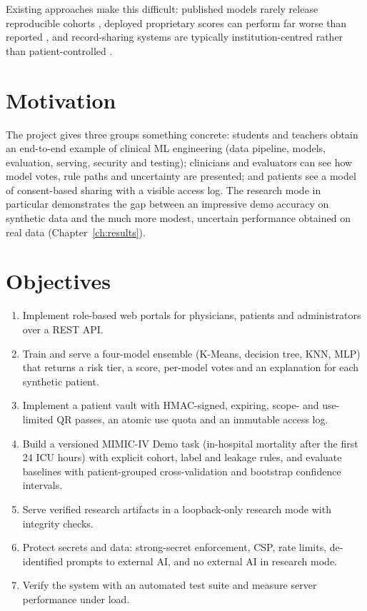 Existing approaches make this difficult: published models rarely release reproducible cohorts
\cite{johnson2017reproducibility}, deployed proprietary scores can perform far worse than reported
\cite{wong2021epicsepsis}, and record-sharing systems are typically institution-centred rather than
patient-controlled \cite{azaria2016medrec}.

\section{Motivation}
The project gives three groups something concrete: students and teachers obtain an end-to-end example
of clinical ML engineering (data pipeline, models, evaluation, serving, security and testing);
clinicians and evaluators can see how model votes, rule paths and uncertainty are presented; and
patients see a model of consent-based sharing with a visible access log. The research mode in
particular demonstrates the gap between an impressive demo accuracy on synthetic data and the much
more modest, uncertain performance obtained on real data (Chapter~\ref{ch:results}).

\section{Objectives}
\begin{enumerate}[label=O\arabic*.]
\item Implement role-based web portals for physicians, patients and administrators over a REST API.
\item Train and serve a four-model ensemble (K-Means, decision tree, KNN, MLP) that returns a risk tier,
      a score, per-model votes and an explanation for each synthetic patient.
\item Implement a patient vault with HMAC-signed, expiring, scope- and use-limited QR passes, an
      atomic use quota and an immutable access log.
\item Build a versioned MIMIC-IV Demo task (in-hospital mortality after the first 24 ICU hours) with
      explicit cohort, label and leakage rules, and evaluate baselines with patient-grouped
      cross-validation and bootstrap confidence intervals.
\item Serve verified research artifacts in a loopback-only research mode with integrity checks.
\item Protect secrets and data: strong-secret enforcement, CSP, rate limits, de-identified prompts
      to external AI, and no external AI in research mode.
\item Verify the system with an automated test suite and measure server performance under load.
\end{enumerate}


